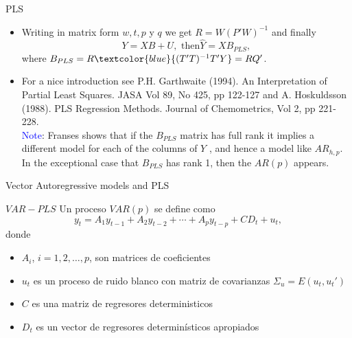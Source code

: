 \documentclass{beamer}
\newcommand{\?}{?`}
\begin{document}
\begin{frame}{PLS}
  \begin{itemize}
  \item Writing in matrix form $w,t,p$ y $q$ we get $R=W(P'W)^{-1}$ and
   finally
    \begin{displaymath}
      Y=XB+U, \text{ then} \hat{Y}=XB_{PLS},
    \end{displaymath}
    where $B_{PLS}=R\textcolor{blue}{(T'T)^{-1}T'Y}=RQ'$.
  \item     \bigskip

    For a nice introduction see P.H. Garthwaite
    (1994). An Interpretation of Partial Least Squares. JASA Vol 89,
    No 425, pp 122-127 and A. Hoskuldsson (1988). PLS Regression Methods. Journal of
    Chemometrics, Vol 2, pp 221-228.\\
    \medskip
    \textcolor{blue}{Note}: Franses shows that if  the $B_{PLS}$ matrix has full rank it implies a different model for
each of the columns of $Y$ , and hence a model like $AR_{h,p}$. In the exceptional case that
$B_{PLS}$ has rank 1, then the $AR(p)$ appears.
  \end{itemize}
\end{frame}

\begin{frame}{}
  \begin{block}{}
    \begin{center}
      \vspace{3mm}
      {\Large Vector Autoregressive models and PLS}
      \vspace{3mm}
    \end{center}
  \end{block}
\end{frame}

\begin{frame}{$VAR-PLS$}
  Un proceso $VAR(p)$ se define como
    \begin{displaymath}
      y_t=A_1y_{t-1} + A_2y_{t-2} + \cdots + A_py_{t-p} + CD_t + u_t,
    \end{displaymath}
    donde
    \begin{itemize}
    \item $A_i$, $i=1,2,\ldots, p$, son matrices de coeficientes
    \item $u_t$ es un proceso de ruido blanco con matriz de
      covarianzas $\Sigma_u=E(u_t,u_t')$
    \item $C$ es una matriz de regresores deterministicos
    \item $D_t$ es un vector de regresores determin\'isticos apropiados
    \end{itemize}
\end{frame}
\end{document}
